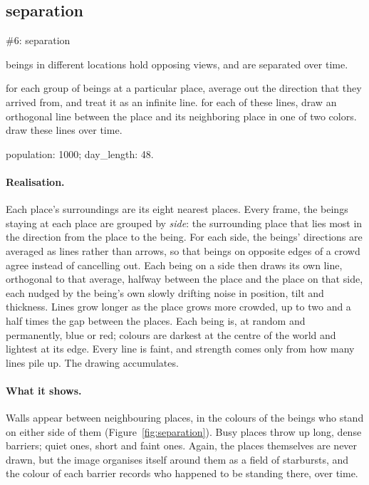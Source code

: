\subsection{separation}
\label{sec:separation}

\begin{interpretation}{\#6: separation}
  \item[thought] beings in different locations hold opposing views, and are separated over time.
  \item[expression] for each group of beings at a particular place, average out the direction that they arrived from, and treat it as an infinite line. for each of these lines, draw an orthogonal line between the place and its neighboring place in one of two colors. draw these lines over time.
  \item[parameters] population: 1000; day\_length: 48.
\end{interpretation}

\paragraph{Realisation.} Each place's surroundings are its eight nearest places. Every frame, the beings staying at each place are grouped by \emph{side}: the surrounding place that lies most in the direction from the place to the being. For each side, the beings' directions are averaged as lines rather than arrows, so that beings on opposite edges of a crowd agree instead of cancelling out. Each being on a side then draws its own line, orthogonal to that average, halfway between the place and the place on that side, each nudged by the being's own slowly drifting noise in position, tilt and thickness. Lines grow longer as the place grows more crowded, up to two and a half times the gap between the places. Each being is, at random and permanently, blue or red; colours are darkest at the centre of the world and lightest at its edge. Every line is faint, and strength comes only from how many lines pile up. The drawing accumulates.

\paragraph{What it shows.} Walls appear between neighbouring places, in the colours of the beings who stand on either side of them (Figure~\ref{fig:separation}). Busy places throw up long, dense barriers; quiet ones, short and faint ones. Again, the places themselves are never drawn, but the image organises itself around them as a field of starbursts, and the colour of each barrier records who happened to be standing there, over time.

